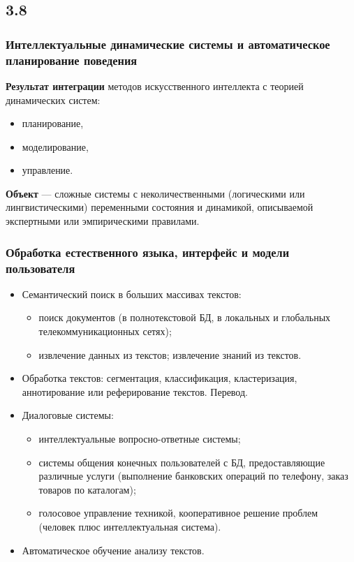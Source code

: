 \documentclass[default]{beamer}
\begin{document}
	\subsection{3.8}
	\begin{frame}
		\frametitle{Интеллектуальные динамические системы и автоматическое планирование поведения}
		
		\textbf{Результат интеграции} методов искусственного интеллекта с теорией динамических систем:
		\begin{itemize}
			\item планирование,
			\item моделирование,
			\item управление.
		\end{itemize}
		\textbf{Объект} --- сложные системы с неколичественными (логическими или лингвистическими) переменными состояния и динамикой, описываемой экспертными или эмпирическими правилами.
	\end{frame}

	\begin{frame}
		\frametitle{Обработка естественного языка, интерфейс и модели пользователя}
		\begin{itemize}
			\small
			\item Семантический поиск в больших массивах текстов:
			\begin{itemize}
				\footnotesize
				\item поиск документов (в полнотекстовой БД, в локальных и глобальных телекоммуникационных сетях);
				\item извлечение данных из текстов;
				извлечение знаний из текстов.
			\end{itemize}
			
			\item Обработка текстов: сегментация, классификация, кластеризация, аннотирование или реферирование текстов. Перевод. 
			\item Диалоговые системы: 
			\begin{itemize}
				\footnotesize
				\item интеллектуальные вопросно-ответные системы; 
				\item системы общения конечных пользователей с БД, предоставляющие  различные услуги (выполнение банковских операций по телефону, заказ товаров по каталогам); 
				\item голосовое управление техникой, кооперативное решение проблем (человек плюс интеллектуальная система).
			\end{itemize}
			
			\item Автоматическое обучение анализу текстов.
			
		\end{itemize}
		
	\end{frame}
\end{document}
